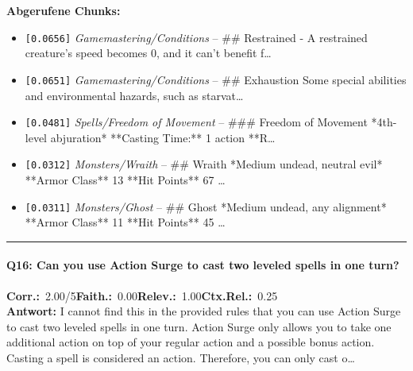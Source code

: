 \noindent\textbf{Abgerufene Chunks:}
\begin{itemize}[noitemsep, topsep=2pt]
  \item[\textbf{\#1}] \texttt{[0.0656]} \textit{Gamemastering/Conditions} -- \#\# Restrained  - A restrained creature's speed becomes 0, and it can't benefit f\ldots
  \item[\textbf{\#2}] \texttt{[0.0651]} \textit{Gamemastering/Conditions} -- \#\# Exhaustion  Some special abilities and environmental hazards, such as starvat\ldots
  \item[\textbf{\#3}] \texttt{[0.0481]} \textit{Spells/Freedom of Movement} -- \#\#\# Freedom of Movement  *4th-level abjuration*  **Casting Time:** 1 action  **R\ldots
  \item[\textbf{\#4}] \texttt{[0.0312]} \textit{Monsters/Wraith} -- \#\# Wraith  *Medium undead, neutral evil*  **Armor Class** 13  **Hit Points** 67 \ldots
  \item[\textbf{\#5}] \texttt{[0.0311]} \textit{Monsters/Ghost} -- \#\# Ghost  *Medium undead, any alignment*  **Armor Class** 11  **Hit Points** 45 \ldots
\end{itemize}
\vspace{4pt}
\hrule
\vspace{6pt}

\paragraph{Q16: Can you use Action Surge to cast two leveled spells in one turn?}
\noindent \textbf{Corr.:}~2.00/5\quad \textbf{Faith.:}~0.00\quad \textbf{Relev.:}~1.00\quad \textbf{Ctx.Rel.:}~0.25\\

\noindent\textbf{Antwort:} I cannot find this in the provided rules that you can use Action Surge to cast two leveled spells in one turn. Action Surge only allows you to take one additional action on top of your regular action and a possible bonus action. Casting a spell is considered an action. Therefore, you can only cast o\ldots

